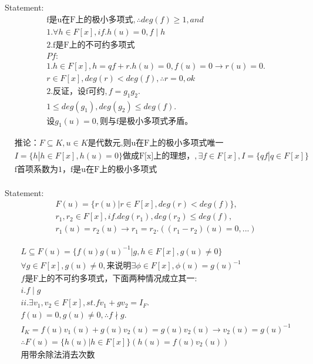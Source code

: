 \documentclass[12pt, a4paper]{article}  %
\begin{document}
Statement:\\
\begin{align}
    &\text{f是u在F上的极小多项式},\therefore deg(f)\geqslant 1,and\\
    &1.\forall h\in F[x],if.h(u)=0,f\mid h\\
    &2.\text{f是F上的不可约多项式}\\
    &Pf:\\
    &1.h\in F[x],h=qf+r.h(u)=0,f(u)=0\rightarrow r(u)=0.\\
    &r\in F[x],deg(r)<deg(f),\therefore r=0,ok\\
    &2.\text{反证，设f可约},f=g_1g_2.\\
    &1\leqslant deg(g_1),deg(g_2)\leqslant deg(f).\\
    &\text{设}g_1(u)=0,\text{则与f是极小多项式矛盾。}
\end{align}

\begin{align}
    &\text{推论：}F\subseteq K,u\in K\text{是代数元,则u在F上的极小多项式唯一}\\
    &I=\{h|h\in F[x],h(u)=0\}\text{做成F[x]上的理想，},\exists f\in F[x],I=\{qf|q\in F[x]\}\\
    &\text{f首项系数为1，f是u在F上的极小多项式}\\
\end{align}

Statement:\\
\begin{align}
    &F(u)=\{r(u)|r\in F[x],deg(r)<deg(f)\},\\
    &r_1,r_2\in F[x],if. deg(r_1),deg(r_2)\leqslant deg(f),\\
    &r_1(u)=r_2(u)\rightarrow r_1=r_2.((r_1-r_2)(u)=0,...)
\end{align}

\begin{align}
    &L\subseteq F(u)=\{f(u)g(u)^{-1}|g,h\in F[x],g(u)\neq 0\}\\
    &\forall g\in F[x],g(u)\neq 0,\text{来说明}\exists \phi\in F[x],\phi(u)=g(u)^{-1}\\
    &f\text{是F上的不可约多项式，下面两种情况成立其一:}\\
    &i.f\mid g\\
    &ii.\exists v_1,v_2\in F[x],st. fv_1+gv_2=I_F.\\
    &f(u)=0,g(u)\neq 0,\therefore f\nmid g.\\
    &I_K=f(u)v_1(u)+g(u)v_2(u)=g(u)v_2(u)\rightarrow v_2(u)=g(u)^{-1}\\ 
    &\therefore F(u)=\{h(u)|h\in F[x]\}(h(u)=f(u)v_2(u))\\
    &\text{用带余除法消去次数}
\end{align}
\end{document}
